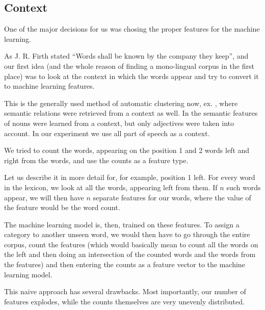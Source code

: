 \documentclass[letterpaper]{article}
\begin{document}
\subsection{Context}
One of the major decisions for us was chosing the proper 
features for the machine learning.

As J. R. Firth stated ``Words shall be known by the company they keep'',
and our first idea (and the whole reason of finding a mono-lingual corpus in the first place) 
was to look at the context in which the words appear and try to convert it to machine learning features.

This is  the generally used method of automatic clustering now, ex. \cite{baroni:2009},
where semantic relations were retrieved from a context as well. 
In \cite{biemann05} the semantic features of nouns were learned
from a context, but only adjectives were taken into account.
In our experiment we use all part of speech as a context. 

We tried to count the words, appearing on the position 1 and 2 words left and 
right from the words, and use the counts as a feature type.

Let us describe it in more detail for, for example,  position 1 left. For every word in the lexicon, we 
look at all the words, appearing left from them. If $n$ such words appear, we will then have $n$ separate 
features for our words, where the value of the feature would be the word count.
 
The machine learning model is, then, trained on these features. To assign a category
to another unseen word, we would then have to go through the entire corpus, count
the features (which would basically mean to count all the words on the left and then doing an 
intersection of the counted words and the words from the features) and then entering the 
counts as a feature vector to the machine learning model.

This naive approach has several drawbacks. Most importantly, our number of features explodes, while the counts themselves are very unevenly distributed.
\end{document}
